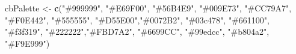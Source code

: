 \documentclass[
]{article}
\newenvironment{Shaded}{\begin{snugshade}}{\end{snugshade}}
\newcommand{\FunctionTok}[1]{\textcolor[rgb]{0.13,0.29,0.53}{\textbf{#1}}}
\newcommand{\NormalTok}[1]{#1}
\newcommand{\OtherTok}[1]{\textcolor[rgb]{0.56,0.35,0.01}{#1}}
\newcommand{\StringTok}[1]{\textcolor[rgb]{0.31,0.60,0.02}{#1}}
\begin{document}
\begin{Shaded}
\begin{Highlighting}[]
\NormalTok{cbPalette }\OtherTok{\textless{}{-}} \FunctionTok{c}\NormalTok{(}\StringTok{"\#999999"}\NormalTok{, }\StringTok{"\#E69F00"}\NormalTok{, }\StringTok{"\#56B4E9"}\NormalTok{, }\StringTok{"\#009E73"}\NormalTok{, }\StringTok{"\#CC79A7"}\NormalTok{, }\StringTok{"\#F0E442"}\NormalTok{,  }
               \StringTok{"\#555555"}\NormalTok{,  }\StringTok{"\#D55E00"}\NormalTok{,}\StringTok{"\#0072B2"}\NormalTok{, }\StringTok{"\#03c478"}\NormalTok{, }\StringTok{"\#661100"}\NormalTok{, }\StringTok{"\#f3f319"}\NormalTok{,  }
               \StringTok{"\#222222"}\NormalTok{,}\StringTok{"\#FBD7A2"}\NormalTok{, }\StringTok{"\#6699CC"}\NormalTok{, }\StringTok{"\#99edcc"}\NormalTok{, }\StringTok{"\#b804a2"}\NormalTok{, }\StringTok{"\#F9E999"}\NormalTok{)}


\end{Highlighting}
\end{Shaded}
\end{document}
